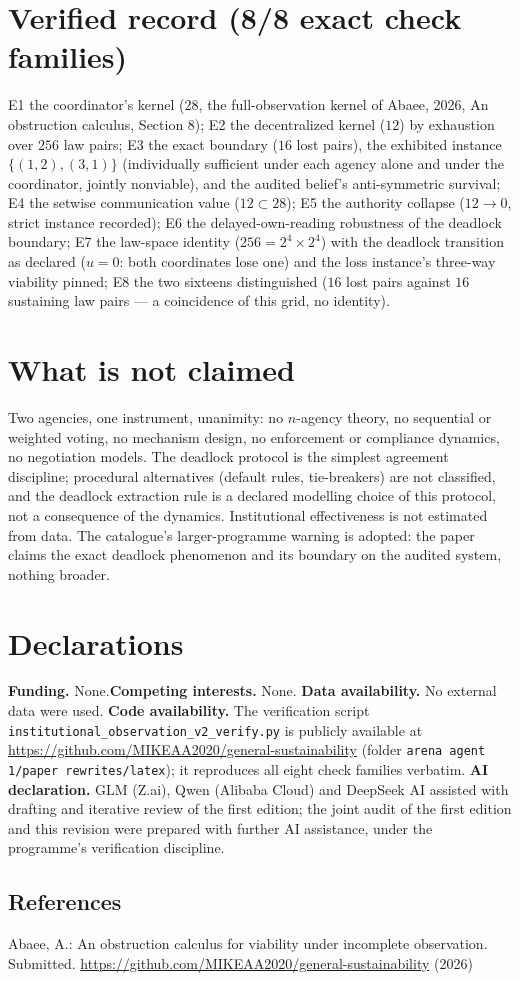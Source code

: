 \documentclass[10pt,twocolumn]{article}
\theoremstyle{definition}
\begin{document}
\section{Verified record (8/8 exact check families)}

E1 the coordinator's kernel ($28$, the full-observation kernel of Abaee, 2026, An obstruction calculus, Section 8); E2 the decentralized kernel ($12$) by exhaustion over
$256$ law pairs; E3 the exact boundary ($16$ lost pairs), the exhibited
instance $\{(1,2),(3,1)\}$ (individually sufficient under each agency
alone and under the coordinator, jointly nonviable), and the audited
belief's anti-symmetric survival; E4 the setwise communication value
($12\subset28$); E5 the authority collapse ($12\to0$, strict instance
recorded); E6 the delayed-own-reading robustness of the deadlock
boundary; E7 the law-space identity ($256=2^{4}\times2^{4}$) with the
deadlock transition as declared ($u=0$: both coordinates lose one) and
the loss instance's three-way viability pinned; E8 the two sixteens
distinguished ($16$ lost pairs against $16$ sustaining law pairs --- a
coincidence of this grid, no identity).

\section{What is not claimed}

Two agencies, one instrument, unanimity: no $n$-agency theory, no
sequential or weighted voting, no mechanism design, no enforcement or
compliance dynamics, no negotiation models. The deadlock protocol is the
simplest agreement discipline; procedural alternatives (default rules,
tie-breakers) are not classified, and the deadlock extraction rule is a
declared modelling choice of this protocol, not a consequence of the
dynamics. Institutional effectiveness is
not estimated from data. The catalogue's larger-programme warning is
adopted: the paper claims the exact deadlock phenomenon and its boundary
on the audited system, nothing broader.


\section*{Declarations}
\textbf{Funding.} None.\quad \textbf{Competing interests.} None.\quad
\textbf{Data availability.} No external data were used.\quad
\textbf{Code availability.} The verification script
\texttt{institutional\_observation\_v2\_verify.py} is publicly available at
\url{https://github.com/MIKEAA2020/general-sustainability} (folder
\texttt{arena agent 1/paper rewrites/latex}); it reproduces all eight check
families verbatim.\quad
\textbf{AI declaration.} GLM (Z.ai), Qwen (Alibaba Cloud) and DeepSeek AI
assisted with drafting and iterative review of the first edition; the joint
audit of the first edition and this revision were prepared with further AI
assistance, under the programme's verification discipline.

\subsection{References}\label{references}
{\footnotesize

Abaee, A.: An obstruction calculus for viability under incomplete
observation. Submitted.
\url{https://github.com/MIKEAA2020/general-sustainability} (2026)

}
\end{document}
